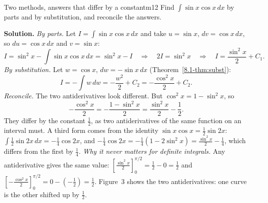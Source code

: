 \documentclass[11pt]{article}
\begin{document}
\begin{exmp}{Two methods, answers that differ by a constant}{m12}
Find $\int\sin x\cos x\,dx$ by parts and by substitution, and reconcile the answers.

\textbf{Solution.} \emph{By parts.} Let $I=\int\sin x\cos x\,dx$ and take $u=\sin x$, $dv=\cos x\,dx$, so $du=\cos x\,dx$ and $v=\sin x$:
\[I=\sin^2x-\int\sin x\cos x\,dx=\sin^2x-I\quad\Longrightarrow\quad2I=\sin^2x\quad\Longrightarrow\quad I=\frac{\sin^2x}2+C_1 .\]
\emph{By substitution.} Let $w=\cos x$, $dw=-\sin x\,dx$ (Theorem~\ref{8.1-thm:subst}):
\[I=-\int w\,dw=-\frac{w^2}2+C_2=-\frac{\cos^2x}2+C_2 .\]
\emph{Reconcile.} The two antiderivatives look different. But $\cos^2x=1-\sin^2x$, so
\[-\frac{\cos^2x}2=-\frac{1-\sin^2x}2=\frac{\sin^2x}2-\frac12 .\]
They differ by the constant $\frac12$, as two antiderivatives of the same function on an interval must. A third form comes from the identity $\sin x\cos x=\frac12\sin2x$: $\int\frac12\sin2x\,dx=-\frac14\cos2x$, and $-\frac14\cos2x=-\frac14\left(1-2\sin^2x\right)=\frac{\sin^2x}2-\frac14$, which differs from the first by $\frac14$.
\emph{Why it never matters for definite integrals.} Any antiderivative gives the same value: $\left[\frac{\sin^2x}2\right]_0^{\pi/2}=\frac12-0=\frac12$ and $\left[-\frac{\cos^2x}2\right]_0^{\pi/2}=0-\left(-\frac12\right)=\frac12$. Figure~3 shows the two antiderivatives: one curve is the other shifted up by $\frac12$.


\end{exmp}
\end{document}
